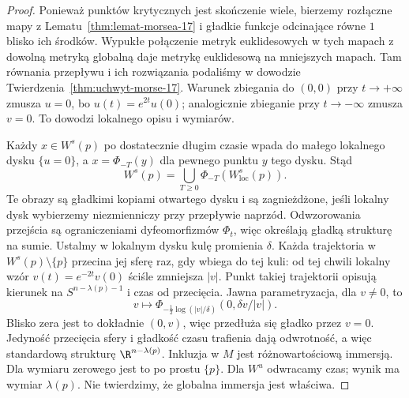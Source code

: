 \begin{proof}
Ponieważ punktów krytycznych
jest skończenie wiele, bierzemy
rozłączne mapy z
Lematu~\ref{thm:lemat-morsea-17}
i gładkie funkcje odcinające
równe $1$ blisko ich środków.
Wypukłe połączenie
metryk euklidesowych w tych
mapach z dowolną metryką
globalną daje metrykę
euklidesową na mniejszych mapach.
Tam równania przepływu
i ich rozwiązania podaliśmy
w dowodzie
Twierdzenia~\ref{thm:uchwyt-morse-17}.
Warunek zbiegania do $(0,0)$
przy $t\to+\infty$ zmusza $u=0$,
bo $u(t)=e^{2t}u(0)$;
analogicznie zbieganie
przy $t\to-\infty$ zmusza $v=0$.
To dowodzi lokalnego opisu
i wymiarów.

Każdy $x\in W^s(p)$
po dostatecznie długim czasie
wpada do małego lokalnego
dysku $\{u=0\}$, a
$x=\Phi_{-T}(y)$
dla pewnego punktu $y$
tego dysku. Stąd
\[
 W^s(p)=\bigcup_{T\geq0}
      \Phi_{-T}(W^s_{\mathrm{loc}}(p)).
\]
Te obrazy są gładkimi kopiami
otwartego dysku i są
zagnieżdżone, jeśli lokalny
dysk wybierzemy niezmienniczy
przy przepływie naprzód.
Odwzorowania przejścia są
ograniczeniami dyfeomorfizmów
$\Phi_t$, więc określają
gładką strukturę na sumie.
Ustalmy w lokalnym dysku
kulę promienia $\delta$.
Każda trajektoria w
$W^s(p)\setminus\{p\}$
przecina jej sferę raz, gdy
wbiega do tej kuli: od tej
chwili lokalny wzór
$v(t)=e^{-2t}v(0)$
ściśle zmniejsza $|v|$.
Punkt takiej trajektorii
opisują kierunek na
$S^{n-\lambda(p)-1}$
i czas od przecięcia.
Jawna parametryzacja, dla $v\ne0$, to
\[
 v\longmapsto
 \Phi_{-\frac12\log(|v|/\delta)}
          (0,\delta v/|v|).
\]
Blisko zera jest to dokładnie $(0,v)$,
więc przedłuża się gładko przez $v=0$.
Jedyność przecięcia sfery i gładkość czasu trafienia
dają odwrotność, a więc standardową
strukturę $\R^{n-\lambda(p)}$.
Inkluzja w $M$ jest
różnowartościową immersją.
Dla wymiaru zerowego
jest to po prostu $\{p\}$.
Dla $W^u$ odwracamy czas;
wynik ma wymiar $\lambda(p)$.
Nie twierdzimy, że globalna
immersja jest właściwa.


\end{proof}
